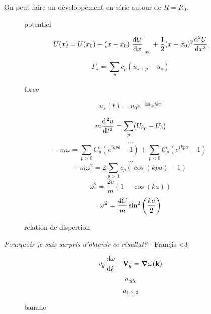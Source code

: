 



On peut faire un développement en série autour de $R = R_0$.

\begin{figure}[ht]
    \centering
    \caption{potentiel}
    \label{fig:potentiel}
\end{figure}

$$U(x) = U(x_0) + (x-x_0)\eval{\dv{U}{x}}_{x_0} + \frac{1}{2} (x-x_0)^2\dv[2]{U}{x}$$ 

$$F_s = \sum_p c_p(u_{s+p}-u_s)$$ 


\begin{figure}[ht]
    \centering
    \caption{force}
    \label{fig:force}
\end{figure}


$$u_s(t) = u_0 e^{-i\omega t}e^{ikx}$$ 

$$m\dv[2]{u}{t} = \sum_p (U_{sp}-U_s)$$ 
$$\dotsb$$ 
$$-m\omega = \sum_{p>0}C_p (e^{ikpa}-1) + \sum_{p<0}C_p(e^{ikpa}-1)$$ 
$$\dotsb$$ 
$$-m\omega^2 = 2\sum_{p>0} c_p(\cos(kpa)-1)$$ 
$$\omega^2 = \frac{2c}{m}(1-\cos(ka))$$ 
$$\omega^2 = \frac{4C}{m}\sin^2\qty(\frac{ka}{2})$$ 

\begin{figure}[ht]
    \centering
    \caption{relation de dispertion}
    \label{fig:relation-de-dispertion}
\end{figure}

\textit{Pourquois je suis surpris d'obtenir ce résultat?} - Françis <3

$$v_g \dv{\omega}{k}\quad \vb V_g =\grad \omega(\vb k)$$ 

$$a_{allo}$$ 

$$a_{1,2,3}$$ 

\begin{figure}[ht]
    \centering
    \caption{banane}
    \label{fig:banane}
\end{figure}


